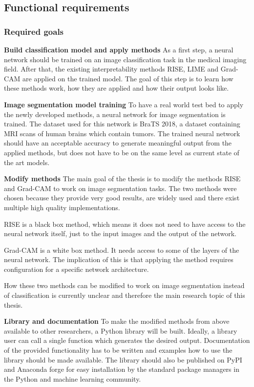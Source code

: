 \subsection{Functional requirements}
\subsubsection{Required goals}

\textbf{Build classification model and apply methods}
As a first step, a neural network should be trained on an image classification task in the medical imaging field.
After that, the existing interpretability methods RISE, LIME and Grad-CAM are applied on the trained model.
The goal of this step is to learn how these methods work, how they are applied and how their output looks like.

\textbf{Image segmentation model training}
To have a real world test bed to apply the newly developed methods, a neural network for image segmentation is trained.
The dataset used for this network is BraTS 2018, a dataset containing MRI scans of human brains which contain tumors.
The trained neural network should have an acceptable accuracy to generate meaningful output from the applied methods, but
does not have to be on the same level as current state of the art models. 

\textbf{Modify methods}
The main goal of the thesis is to modify the methods RISE and Grad-CAM to work on image segmentation tasks.
The two methods were chosen because they provide very good results, are widely used and there exist multiple high
quality implementations.

RISE is a black box method, which means it does not need to have access to the neural network itself,
just to the input images and the output of the network.

Grad-CAM is a white box method. It needs access to some of the layers of the neural network. The implication of this
is that applying the method requires configuration for a specific network architecture.

How these two methods can be modified to work on image segmentation instead of classification is currently unclear and therefore the main research topic of this thesis.

\textbf{Library and documentation}
To make the modified methods from above available to other researchers, a Python library will be built. Ideally, a library user can call a single function
which generates the desired output. Documentation of the provided functionality has to be written and examples how to use the library should be made available. The library should also be published on PyPI and Anaconda forge for easy installation by the standard package managers in the
Python and machine learning community.

